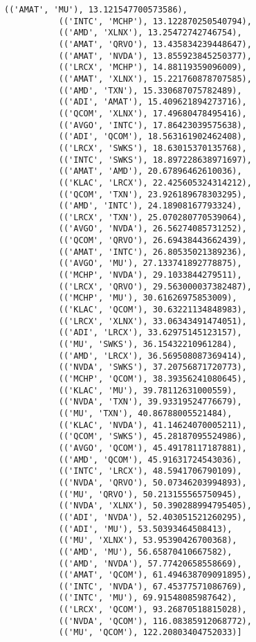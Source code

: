 \documentclass[11pt]{article}
\begin{document}
\begin{Verbatim}[commandchars=\\\{\}]
           (('AMAT', 'MU'), 13.121547700573586),
           (('INTC', 'MCHP'), 13.122870250540794),
           (('AMD', 'XLNX'), 13.25472742746754),
           (('AMAT', 'QRVO'), 13.435834239448647),
           (('AMAT', 'NVDA'), 13.855923845250377),
           (('LRCX', 'MCHP'), 14.88119359096009),
           (('AMAT', 'XLNX'), 15.221760878707585),
           (('AMD', 'TXN'), 15.330687075782489),
           (('ADI', 'AMAT'), 15.409621894273716),
           (('QCOM', 'XLNX'), 17.49680478495416),
           (('AVGO', 'INTC'), 17.86423039575638),
           (('ADI', 'QCOM'), 18.563161902462408),
           (('LRCX', 'SWKS'), 18.63015370135768),
           (('INTC', 'SWKS'), 18.897228638971697),
           (('AMAT', 'AMD'), 20.67896462610036),
           (('KLAC', 'LRCX'), 22.425605324314212),
           (('QCOM', 'TXN'), 23.926189678303295),
           (('AMD', 'INTC'), 24.18908167793324),
           (('LRCX', 'TXN'), 25.070280770539064),
           (('AVGO', 'NVDA'), 26.56274085731252),
           (('QCOM', 'QRVO'), 26.69438443662439),
           (('AMAT', 'INTC'), 26.80535021389236),
           (('AVGO', 'MU'), 27.133741892778875),
           (('MCHP', 'NVDA'), 29.1033844279511),
           (('LRCX', 'QRVO'), 29.563000037382487),
           (('MCHP', 'MU'), 30.61626975853009),
           (('KLAC', 'QCOM'), 30.63221134848983),
           (('LRCX', 'XLNX'), 33.06343491474051),
           (('ADI', 'LRCX'), 33.62975145123157),
           (('MU', 'SWKS'), 36.15432210961284),
           (('AMD', 'LRCX'), 36.569508087369414),
           (('NVDA', 'SWKS'), 37.20756871720773),
           (('MCHP', 'QCOM'), 38.39356241080645),
           (('KLAC', 'MU'), 39.78112631000559),
           (('NVDA', 'TXN'), 39.93319524776679),
           (('MU', 'TXN'), 40.86788005521484),
           (('KLAC', 'NVDA'), 41.14624070005211),
           (('QCOM', 'SWKS'), 45.28187095524986),
           (('AVGO', 'QCOM'), 45.49178117187881),
           (('AMD', 'QCOM'), 45.91631724543036),
           (('INTC', 'LRCX'), 48.5941706790109),
           (('NVDA', 'QRVO'), 50.07346203994893),
           (('MU', 'QRVO'), 50.213155565750945),
           (('NVDA', 'XLNX'), 50.390288994795405),
           (('ADI', 'NVDA'), 52.403051521260295),
           (('ADI', 'MU'), 53.50393464508413),
           (('MU', 'XLNX'), 53.95390426700368),
           (('AMD', 'MU'), 56.65870410667582),
           (('AMD', 'NVDA'), 57.77420658558669),
           (('AMAT', 'QCOM'), 61.494638709091895),
           (('INTC', 'NVDA'), 67.45377571086769),
           (('INTC', 'MU'), 69.91548085987642),
           (('LRCX', 'QCOM'), 93.26870518815028),
           (('NVDA', 'QCOM'), 116.08385912068772),
           (('MU', 'QCOM'), 122.20803404752033)]
\end{Verbatim}
            
\end{document}
